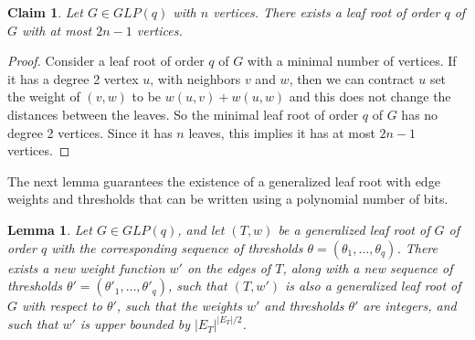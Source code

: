 \documentclass[11pt, letter]{article}
\newtheorem{lemma}[theorem]{Lemma}
\newtheorem{claim}[theorem]{Claim}
\theoremstyle{remark}
\begin{document}
\begin{claim}\label{cl:numbervertices}
    Let $G\in GLP(q)$ with $n$ vertices. There exists a leaf root of order $q$ of $G$ with at most $2n-1$ vertices.
\end{claim}

\begin{proof}
    Consider a leaf root of order $q$ of $G$ with a minimal number of vertices. If it has a degree 2 vertex $u$, with neighbors $v$ and $w$, then we can contract $u$ set the weight of $(v,w)$ to be $w(u,v)+w(u,w)$ and this does not change the distances between the leaves. So the minimal leaf root of order $q$ of $G$ has no degree 2 vertices. Since it has $n$ leaves, this implies it has at most $2n-1$ vertices.
\end{proof}

 The next lemma guarantees the existence of a generalized leaf root with edge weights and thresholds that can be written using a polynomial number of bits.


\begin{lemma}\label{lem:weight-bound}
    Let $G \in GLP(q)$, and let $(T, w)$ be a generalized leaf root of $G$ of order $q$ with the corresponding sequence of thresholds $\theta = (\theta_1, \dots, \theta_q)$. There exists a new weight function $w'$ on the edges of $T$, along with a new sequence of thresholds $\theta' = (\theta'_1, \dots, \theta'_q)$, such that $(T, w')$ is also a generalized leaf root of $G$ with respect to $\theta'$, such that the weights $w'$ and thresholds $\theta'$ are integers, and such that $w'$ is upper bounded by $|E_T|^{|E_T|/2}$.
\end{lemma}
\end{document}
